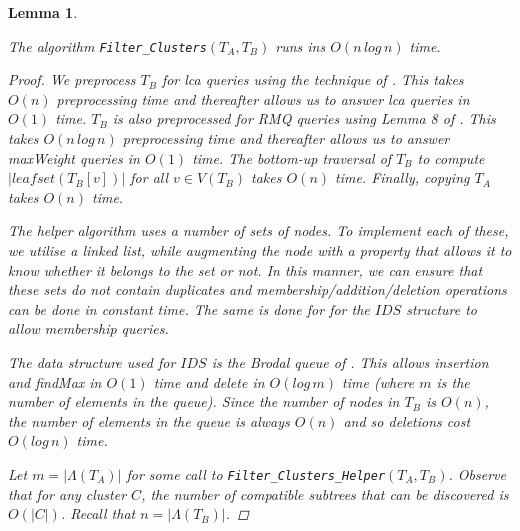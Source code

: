 \documentclass{article}
\newcommand{\leafset}{\Lambda}
\newtheorem{filterclustersruntime}[incompatibility]{Lemma}
\begin{document}
    \begin{filterclustersruntime}
        \label{lem:filterclustersruntime}

        The algorithm \texttt{Filter\_Clusters}$(T_A, T_B)$ runs ins $O(n\,log\,n)$ time.

        \begin{proof}
            We preprocess $T_B$ for \textit{lca} queries using the technique of \cite{bender2000lca}. This takes $O(n)$ preprocessing time and thereafter allows us to answer \textit{lca} queries in $O(1)$ time. $T_B$ is also preprocessed for RMQ queries using Lemma 8 of \cite{jansson2018algorithms}. This takes $O(n\,log\,n)$ preprocessing time and thereafter allows us to answer \textit{maxWeight} queries in $O(1)$ time. The bottom-up traversal of $T_B$ to compute $|leafset(T_B[v])|$ for all $v \in V(T_B)$ takes $O(n)$ time. Finally, copying $T_A$ takes $O(n)$ time.

            The helper algorithm uses a number of sets of nodes. To implement each of these, we utilise a linked list, while augmenting the node with a property that allows it to know whether it belongs to the set or not. In this manner, we can ensure that these sets do not contain duplicates and membership/addition/deletion operations can be done in constant time. The same is done for for the $IDS$ structure to allow membership queries.

            The data structure used for $IDS$ is the Brodal queue of \cite{brodal1995fast}. This allows insertion and findMax in $O(1)$ time and delete in $O(log\,m)$ time (where $m$ is the number of elements in the queue). Since the number of nodes in $T_B$ is $O(n)$, the number of elements in the queue is always $O(n)$ and so deletions cost $O(log\,n)$ time.

            Let $m = |\leafset(T_A)|$ for some call to \texttt{Filter\_Clusters\_Helper}$(T_A, T_B)$. Observe that for any cluster $C$, the number of compatible subtrees that can be discovered is $O(|C|)$. Recall that $n = |\leafset(T_B)|$.


\end{proof}
\end{filterclustersruntime}
\end{document}
